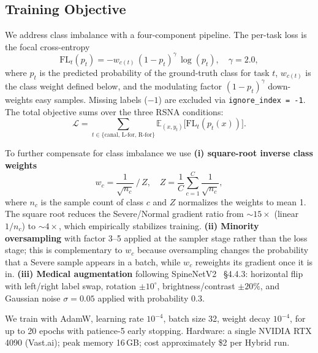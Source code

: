 \documentclass[conference]{IEEEtran}
\begin{document}
\subsection{Training Objective}

We address class imbalance with a four-component pipeline. The
per-task loss is the focal cross-entropy~\cite{lin2017focal}
\begin{equation}
\mathrm{FL}_t(p_t) = -w_{c(t)}\,(1 - p_t)^{\gamma}\, \log(p_t),
\quad \gamma = 2.0,
\label{eq:focal}
\end{equation}
where $p_t$ is the predicted probability of the ground-truth class for
task $t$, $w_{c(t)}$ is the class weight defined below, and the modulating
factor $(1 - p_t)^{\gamma}$ down-weights easy samples. Missing labels
($-1$) are excluded via \verb|ignore_index = -1|. The total objective
sums over the three RSNA conditions:
\begin{equation}
\mathcal{L} = \sum_{t \in \{\text{canal, L-for, R-for}\}}
              \mathbb{E}_{(x,y_t)}\big[\mathrm{FL}_t(p_t(x))\big].
\label{eq:total_loss}
\end{equation}

To further compensate for class imbalance we use
\textbf{(i) square-root inverse class weights}
\begin{equation}
w_c = \frac{1}{\sqrt{n_c}}\,/\,Z, \quad
Z = \frac{1}{C}\sum_{c=1}^{C} \frac{1}{\sqrt{n_c}},
\label{eq:classweight}
\end{equation}
where $n_c$ is the sample count of class $c$ and $Z$ normalizes the
weights to mean 1. The square root reduces the Severe/Normal gradient
ratio from $\sim 15\!\times$ (linear $1/n_c$) to $\sim 4\!\times$,
which empirically stabilizes training.
\textbf{(ii) Minority oversampling} with factor 3--5 applied at the
sampler stage rather than the loss stage; this is complementary to
$w_c$ because oversampling changes the probability that a Severe
sample appears in a batch, while $w_c$ reweights its gradient once it
is in.
\textbf{(iii) Medical augmentation} following
SpineNetV2~\cite{windsor2022} \S4.4.3: horizontal flip with left/right
label swap, rotation $\pm 10^{\circ}$, brightness/contrast $\pm 20\%$,
and Gaussian noise $\sigma = 0.05$ applied with probability $0.3$.

We train with AdamW, learning rate $10^{-4}$, batch size 32, weight
decay $10^{-4}$, for up to 20 epochs with patience-5 early stopping.
Hardware: a single NVIDIA RTX 4090 (Vast.ai); peak memory 16\,GB; cost
approximately \$2 per Hybrid run.
\end{document}
